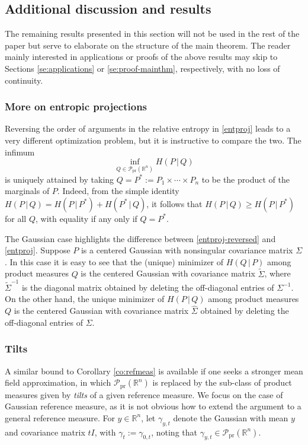 \documentclass[11pt,reqno]{amsart}
\numberwithin{equation}{section}
\theoremstyle{definition}
\def\R{{\mathbb R}}
\def\P{{\mathcal P}}
\def\Pprod{\P_{\mathrm{pr}}}
\begin{document}
\subsection{Additional discussion and results}

	The remaining results presented in this section will not be used in the rest of the paper but serve to elaborate on the structure of the main theorem. The reader mainly interested in applications or proofs of the above results may skip to Sections \ref{se:applications} or \ref{se:proof-mainthm}, respectively, with no loss of continuity.


\subsubsection{More on entropic projections}
Reversing the order of arguments in the relative entropy in \eqref{entproj} leads to a very different optimization problem, but  it is instructive to compare the two. 
The infimum
\begin{equation}
	\inf_{Q \in \Pprod(\R^n)}H(P\,|\,Q) \label{entproj-reversed}
\end{equation}
is uniquely attained by taking $Q=P^*:=P_1\times \cdots \times P_n$ to be the product of the marginals of $P$. 
Indeed, from the simple identity $H(P\,|\,Q) = H(P\,|\,P^*) + H(P^*\,|\,Q)$, it follows that $H(P\,|\,Q) \ge H(P\,|\,P^*)$ for all $Q$, with equality if any only if $Q=P^*$. 

The Gaussian case highlights the difference between \eqref{entproj-reversed} and \eqref{entproj}. Suppose $P$ is a centered Gaussian with nonsingular covariance matrix $\Sigma$. In this case it is easy to see that the (unique) minimizer of $H(Q\,|\,P)$ among product measures $Q$ is the centered Gaussian with covariance matrix $\widetilde\Sigma$, where $\widetilde\Sigma^{-1}$ is the diagonal matrix obtained by deleting the off-diagonal entries of $\Sigma^{-1}$. On the other hand, the unique minimizer of $H(P\,|\,Q)$ among product measures $Q$ is the centered Gaussian with covariance matrix $\widehat\Sigma$ obtained by deleting the off-diagonal entries of $\Sigma$.


\subsubsection{Tilts}
A similar bound to Corollary \ref{co:refmeas} is available if one seeks a stronger mean field approximation, in which $\Pprod(\R^n)$ is replaced by the sub-class of product measures given by \emph{tilts} of a given reference measure.
We focus on the case of Gaussian reference measure, as it is not obvious how to extend the argument to a general reference measure. For $y \in \R^n$, let $\gamma_{y,t}$ denote the Gaussian with mean $y$ and covariance matrix $tI$, with $\gamma_t:=\gamma_{0,t}$, noting that $\gamma_{y,t} \in \Pprod(\R^n)$.
\end{document}
